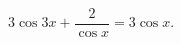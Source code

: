 \begin{ex}[type=equation]
	\begin{condition}
		$3\cos 3x +\dfrac{2}{\cos x} = 3\cos x. $
	\end{condition}
\end{ex}